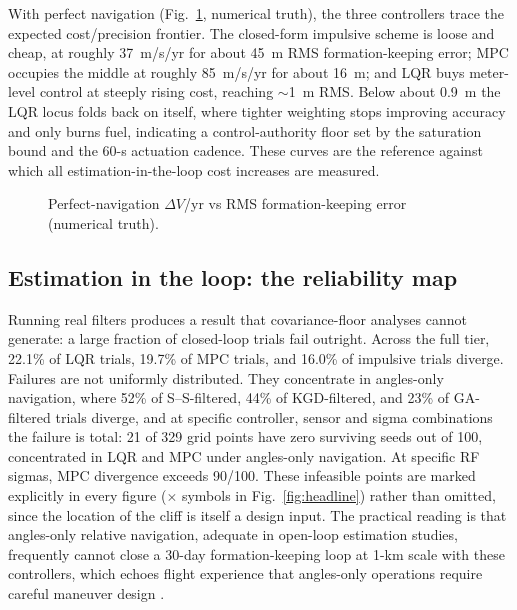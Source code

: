 With perfect navigation (Fig.~\ref{fig:perfect}, numerical truth), the
three controllers trace the expected cost/precision frontier. The
closed-form impulsive scheme is loose and cheap, at roughly 37~m/s/yr for
about 45~m RMS formation-keeping error; MPC occupies the middle at roughly
85~m/s/yr for about 16~m; and LQR buys meter-level control at steeply rising
cost, reaching $\sim$1~m RMS. Below about 0.9~m the LQR locus folds back on
itself, where tighter weighting stops improving accuracy and only burns
fuel, indicating a control-authority floor set by the saturation bound and
the 60-s actuation cadence. These curves are the reference against which all
estimation-in-the-loop cost increases are measured.

\begin{figure}[t]
  \centering
  \caption{Perfect-navigation $\Delta V$/yr vs RMS formation-keeping error
  (numerical truth).}
  \label{fig:perfect}
\end{figure}

\subsection{Estimation in the loop: the reliability map}

Running real filters produces a result that covariance-floor analyses cannot
generate: a large fraction of closed-loop trials fail outright. Across the
full tier, 22.1\% of LQR trials, 19.7\% of MPC trials, and 16.0\% of
impulsive trials diverge. Failures are not uniformly distributed. They
concentrate in angles-only navigation, where 52\% of S--S-filtered, 44\% of
KGD-filtered, and 23\% of GA-filtered trials diverge, and at specific
controller, sensor and sigma combinations the failure is total: 21 of 329
grid points have zero surviving seeds out of 100, concentrated in LQR and
MPC under angles-only navigation. At specific RF sigmas, MPC divergence
exceeds 90/100. These infeasible points are marked explicitly in every
figure ($\times$ symbols in Fig.~\ref{fig:headline}) rather than omitted,
since the location of the cliff is itself a design input. The practical
reading is that angles-only relative navigation, adequate in open-loop
estimation studies, frequently cannot close a 30-day formation-keeping loop
at 1-km scale with these controllers, which echoes flight experience that
angles-only operations require careful maneuver design
\cite{damico2013argon,gaias2014anglesonly}.


